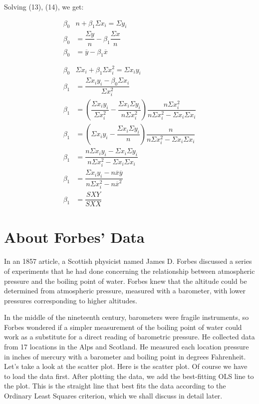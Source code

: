 \documentclass{article}
\begin{document}
    Solving (13), (14), we get:
    
    \begin{align} 
        \beta_{0} &n + \beta_{1} \Sigma x_{i} = \Sigma y_{i}                \nonumber \\
        \beta_{0} &= \dfrac {\Sigma y}{n} - \beta_{1}  \dfrac {\Sigma x}{n} \nonumber \\
        \beta_{0} &= \overline{y} - \beta_{1}  \overline{x}                 \\
        \nonumber \\
        \nonumber \\
        \beta_{0} &\Sigma x_{i} + \beta_{1} \Sigma x_{i}^2 = \Sigma x_{i} y_{i} \nonumber \\
        \beta_{1} &= \dfrac{\Sigma x_{i}y_{i} - \beta _{0} \Sigma x_{i} }{ \Sigma x_{i}^2} \nonumber \\
        \beta_{1} &= \left ( \dfrac{\Sigma x_{i}y_{i}}{\Sigma x_{i}^2} - \dfrac{\Sigma x_{i} \Sigma y_{i}}{n \Sigma x_{i}^2} \right ) 
        \dfrac{n \Sigma x_{i}^2}{n\Sigma x_{i}^2 - \Sigma x_{i} \Sigma x_{i}} \nonumber \\
        \beta_{1} &= \left ( \Sigma x_{i}y_{i} - \dfrac{\Sigma x_{i} \Sigma y_{i}}{n} \right ) 
        \dfrac{n}{n\Sigma x_{i}^2 - \Sigma x_{i} \Sigma x_{i}} \nonumber \\
        \beta_{1} &= \dfrac{n \Sigma x_{i} y_{i} - \Sigma x_{i} \Sigma y_{i}}{n \Sigma x_{i}^2 - \Sigma x_{i} \Sigma x_{i}} \nonumber \\
        \beta_{1} &= \dfrac{\Sigma x_{i} y_{i} - n \overline{x} \overline{y}}{n \Sigma x_{i}^2 - n \overline{x}^2} \nonumber \\
        \beta_{1} &= \dfrac{SXY}{SXX}
    \end{align}
    
\section {About Forbes' Data}
    
    In an 1857 article, a Scottish physicist named James D. Forbes discussed a series of experiments that he had done concerning the relationship between atmospheric pressure and the boiling point of water. Forbes knew that the altitude could be determined from atmospheric pressure, measured with a barometer, with lower pressures corresponding to higher altitudes.
    
    In the middle of the nineteenth century, barometers were fragile instruments, so Forbes wondered if a simpler measurement of the boiling point of water could work as a substitute for a direct reading of barometric pressure. He collected data from 17 locations in the Alps and Scotland. He measured each location pressure in inches of mercury with a barometer and boiling point in degrees Fahrenheit. Let’s take a look at the scatter plot. Here is the scatter plot. %
    Of course we have to load the data first. After plotting the data, we add the best-fitting OLS line to the plot. This is the straight line that best fits the data according to the Ordinary Least Squares criterion, which we shall discuss in detail later.
    
\end{document}
